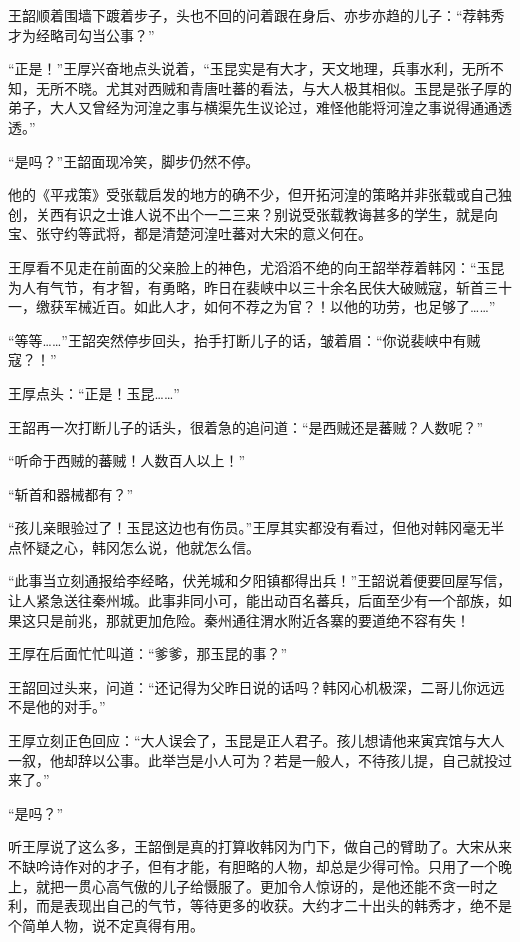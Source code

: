 王韶顺着围墙下踱着步子，头也不回的问着跟在身后、亦步亦趋的儿子：“荐韩秀才为经略司勾当公事？”

“正是！”王厚兴奋地点头说着，“玉昆实是有大才，天文地理，兵事水利，无所不知，无所不晓。尤其对西贼和青唐吐蕃的看法，与大人极其相似。玉昆是张子厚的弟子，大人又曾经为河湟之事与横渠先生议论过，难怪他能将河湟之事说得通通透透。”

“是吗？”王韶面现冷笑，脚步仍然不停。

他的《平戎策》受张载启发的地方的确不少，但开拓河湟的策略并非张载或自己独创，关西有识之士谁人说不出个一二三来？别说受张载教诲甚多的学生，就是向宝、张守约等武将，都是清楚河湟吐蕃对大宋的意义何在。

王厚看不见走在前面的父亲脸上的神色，尤滔滔不绝的向王韶举荐着韩冈：“玉昆为人有气节，有才智，有勇略，昨日在裴峡中以三十余名民伕大破贼寇，斩首三十一，缴获军械近百。如此人才，如何不荐之为官？！以他的功劳，也足够了……”

“等等……”王韶突然停步回头，抬手打断儿子的话，皱着眉：“你说裴峡中有贼寇？！”

王厚点头：“正是！玉昆……”

王韶再一次打断儿子的话头，很着急的追问道：“是西贼还是蕃贼？人数呢？”

“听命于西贼的蕃贼！人数百人以上！”

“斩首和器械都有？”

“孩儿亲眼验过了！玉昆这边也有伤员。”王厚其实都没有看过，但他对韩冈毫无半点怀疑之心，韩冈怎么说，他就怎么信。

“此事当立刻通报给李经略，伏羌城和夕阳镇都得出兵！”王韶说着便要回屋写信，让人紧急送往秦州城。此事非同小可，能出动百名蕃兵，后面至少有一个部族，如果这只是前兆，那就更加危险。秦州通往渭水附近各寨的要道绝不容有失！

王厚在后面忙忙叫道：“爹爹，那玉昆的事？”

王韶回过头来，问道：“还记得为父昨日说的话吗？韩冈心机极深，二哥儿你远远不是他的对手。”

王厚立刻正色回应：“大人误会了，玉昆是正人君子。孩儿想请他来寅宾馆与大人一叙，他却辞以公事。此举岂是小人可为？若是一般人，不待孩儿提，自己就投过来了。”

“是吗？”

听王厚说了这么多，王韶倒是真的打算收韩冈为门下，做自己的臂助了。大宋从来不缺吟诗作对的才子，但有才能，有胆略的人物，却总是少得可怜。只用了一个晚上，就把一贯心高气傲的儿子给慑服了。更加令人惊讶的，是他还能不贪一时之利，而是表现出自己的气节，等待更多的收获。大约才二十出头的韩秀才，绝不是个简单人物，说不定真得有用。

